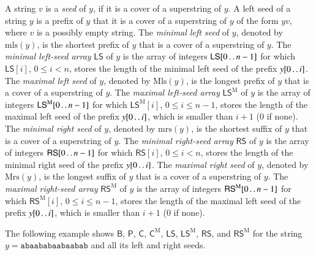 \documentclass[preprint,12pt]{elsarticle}
\newcommand{\dd}{\mathinner{\ldotp\ldotp}}
\newcommand{\carr}{\textsf{C}}      %
\newcommand{\cmarr}{\textsf{C}^\mathrm{M}}      %
\newcommand{\sarr}{\textsf{LS}}      %
\newcommand{\rsarr}{\textsf{RS}}      %
\newcommand{\smarr}{\textsf{LS}^\mathrm{M}}      %
\newcommand{\rsmarr}{\textsf{RS}^\mathrm{M}}      %
\newcommand{\parr}{\textsf{P}}      %
\newcommand{\barr}{\textsf{B}}      %
\newcommand{\mls}[1]{\ensuremath{\mathrm{mls}(#1)}}
\newcommand{\Mls}[1]{\ensuremath{\mathrm{Mls}(#1)}}
\newcommand{\mrs}[1]{\ensuremath{\mathrm{mrs}(#1)}}
\newcommand{\Mrs}[1]{\ensuremath{\mathrm{Mrs}(#1)}}
\begin{document}
A string $v$ is a \emph{seed} of $y$, if it is a cover
of a superstring of $y$. A left seed of a string $y$ is a prefix of $y$ that it is
a cover of a superstring of $y$ of the form $yv$, where $v$ is a possibly empty string.
The {\em minimal left seed} of $y$, denoted by $\mls{y}$, is the shortest prefix of $y$ that is a cover of a superstring of $y$.
The {\em minimal left-seed array} $\sarr$ of $y$ is the array of integers $\sarr[0 \dd n-1]$
for which $\sarr[i]$, $0\leq i < n$, stores the length of the minimal left seed of the prefix $y[0 \dd i]$.
The {\em maximal left seed} of $y$, denoted by $\Mls{y}$, is the longest prefix of $y$ that is a cover of a superstring of $y$.
The {\em maximal left-seed array} $\smarr$ of $y$ is the array of integers $\smarr[0 \dd n-1]$
for which $\smarr[i]$, $0\leq i \leq n-1$, stores the length of the maximal left seed of the prefix $y[0 \dd i]$, 
which is smaller than $i+1$ (0 if none).
The {\em minimal right seed} of $y$, denoted by $\mrs{y}$, is the shortest suffix of $y$ that is a cover of a superstring of $y$.
The {\em minimal right-seed array} $\rsarr$ of $y$ is the array of integers $\rsarr[0 \dd n-1]$
for which $\rsarr[i]$, $0\leq i < n$, stores the length of the minimal right seed of the prefix $y[0 \dd i]$.
The {\em maximal right seed} of $y$, denoted by $\Mrs{y}$, is the longest suffix of $y$ that is a cover of a superstring of $y$.
The {\em maximal right-seed array} $\rsmarr$ of $y$ is the array of integers $\rsmarr[0 \dd n-1]$
for which $\rsmarr[i]$, $0\leq i \leq n-1$, stores the length of the maximal left seed of the prefix $y[0 \dd i]$, 
which is smaller than $i+1$ (0 if none).

The following example  shows $\barr$, $\parr$, $\carr$, $\cmarr$, $\sarr$, $\smarr$, $\rsarr$, and $\rsmarr$ for the 
string $y=\texttt{abaababaabaabab}$ and all its left and right seeds. \\
\end{document}
